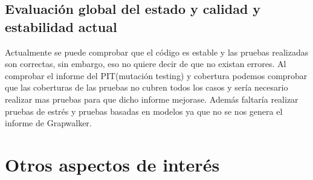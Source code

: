 \documentclass[DIV=calc,paper=a4,fontsize=11pt,onecolumn]{scrartcl} %
\newcommand{\hint}[1]{\begin{quote}\itshape #1 \end{quote}}
\begin{document}
  	\subsection{Evaluación global del estado y calidad y estabilidad actual}
  	Actualmente se puede comprobar que el código es estable y las pruebas realizadas son correctas, sin embargo, eso no quiere decir de que no existan errores. 
  	Al comprobar el informe del PIT(mutación testing) y cobertura podemos comprobar que las coberturas de las pruebas no cubren todos los casos y sería necesario realizar mas pruebas para que dicho informe mejorase.
  	Además faltaría realizar pruebas de estrés y pruebas basadas en modelos ya que no se nos genera el informe de Grapwalker.
 

\section{Otros aspectos de interés}

\end{document}
